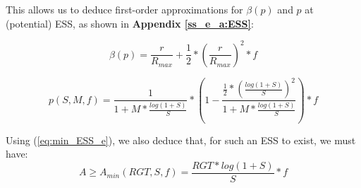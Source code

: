 \documentclass[a4paper,12pt]{report}
\begin{document}
This allows us to deduce first-order approximations for $\beta(p)$ and $p$ at (potential) ESS, as shown in
\textbf{Appendix \ref{ss_e_a:ESS}}:

\begin{equation}
    \label{eq:ESS_e_duh_beta}
    \beta(p) = \frac{r}{R_{max}}+\frac{1}{2}*(\frac{r}{R_{max}})^2*f
\end{equation}

 \begin{equation}
    \label{eq:approx_p_exo}
    p(S,M,f) = \frac{1}{1+M*\frac{log(1+S)}{S}}*
    (1- \frac{\frac{1}{2}*
    (\frac{log(1+S)}{S})^2}{1+M*\frac{log(1+S)}{S}})*f
    \end{equation}




Using (\ref{eq:min_ESS_e}), we also deduce that, for such an ESS to exist, we must have:
\begin{equation}
    \label{eq:min_A_e}
    A \geq A_{min}(RGT,S,f)=\frac{RGT*log(1+S)}{S}*f
\end{equation}





%
\end{document}
